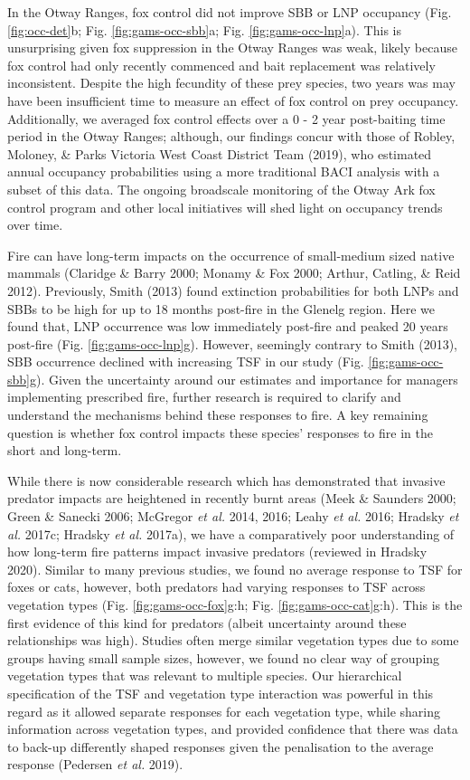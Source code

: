 \documentclass[11pt,a4paper,titlepage,twoside,openright]{style/unimelbthesis}
\begin{document}
\begin{mainmatter}
In the Otway Ranges, fox control did not improve SBB or LNP occupancy (Fig. \ref{fig:occ-det}b; Fig. \ref{fig:gams-occ-sbb}a; Fig. \ref{fig:gams-occ-lnp}a). This is unsurprising given fox suppression in the Otway Ranges was weak, likely because fox control had only recently commenced and bait replacement was relatively inconsistent. Despite the high fecundity of these prey species, two years was may have been insufficient time to measure an effect of fox control on prey occupancy. Additionally, we averaged fox control effects over a 0 - 2 year post-baiting time period in the Otway Ranges; although, our findings concur with those of Robley, Moloney, \& Parks Victoria West Coast District Team (2019), who estimated annual occupancy probabilities using a more traditional BACI analysis with a subset of this data. The ongoing broadscale monitoring of the Otway Ark fox control program and other local initiatives will shed light on occupancy trends over time.

Fire can have long-term impacts on the occurrence of small-medium sized native mammals (Claridge \& Barry 2000; Monamy \& Fox 2000; Arthur, Catling, \& Reid 2012). Previously, Smith (2013) found extinction probabilities for both LNPs and SBBs to be high for up to 18 months post-fire in the Glenelg region. Here we found that, LNP occurrence was low immediately post-fire and peaked 20 years post-fire (Fig. \ref{fig:gams-occ-lnp}g). However, seemingly contrary to Smith (2013), SBB occurrence declined with increasing TSF in our study (Fig. \ref{fig:gams-occ-sbb}g). Given the uncertainty around our estimates and importance for managers implementing prescribed fire, further research is required to clarify and understand the mechanisms behind these responses to fire. A key remaining question is whether fox control impacts these species' responses to fire in the short and long-term.

While there is now considerable research which has demonstrated that invasive predator impacts are heightened in recently burnt areas (Meek \& Saunders 2000; Green \& Sanecki 2006; McGregor \emph{et al.} 2014, 2016; Leahy \emph{et al.} 2016; Hradsky \emph{et al.} 2017c; Hradsky \emph{et al.} 2017a), we have a comparatively poor understanding of how long-term fire patterns impact invasive predators (reviewed in Hradsky 2020). Similar to many previous studies, we found no average response to TSF for foxes or cats, however, both predators had varying responses to TSF across vegetation types (Fig. \ref{fig:gams-occ-fox}g:h; Fig. \ref{fig:gams-occ-cat}g:h). This is the first evidence of this kind for predators (albeit uncertainty around these relationships was high). Studies often merge similar vegetation types due to some groups having small sample sizes, however, we found no clear way of grouping vegetation types that was relevant to multiple species. Our hierarchical specification of the TSF and vegetation type interaction was powerful in this regard as it allowed separate responses for each vegetation type, while sharing information across vegetation types, and provided confidence that there was data to back-up differently shaped responses given the penalisation to the average response (Pedersen \emph{et al.} 2019).


\end{mainmatter}
\end{document}
